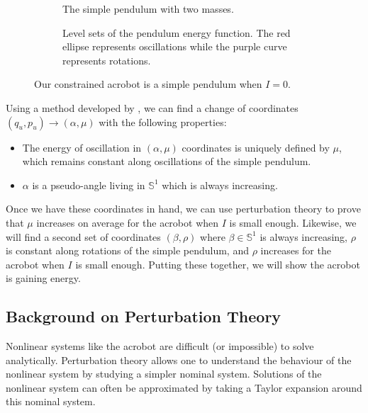 \begin{figure}
    \centering
    \begin{subfigure}[t]{0.45\textwidth}
        \caption{The simple pendulum with two masses.}
        \label{fig:acrobot-I0}
    \end{subfigure}
    \hfill
    \begin{subfigure}[t]{0.45\textwidth}
        \caption{Level sets of the pendulum energy function.
            The red ellipse represents oscillations while the purple curve
            represents rotations.}
        \label{fig:pendulum-level-sets}
    \end{subfigure}
    \caption{Our constrained acrobot is a simple pendulum when \(I = 0\).}
\end{figure}

Using a method developed by \citet{dynamic_vhcs_stabilize_closed_orbits},
we can find a change of coordinates \((q_u,p_u) \to (\alpha, \mu)\) with the
following properties:
\begin{itemize}
    \item The energy of oscillation in \((\alpha,\mu)\) coordinates is 
        uniquely defined by \(\mu\), which remains constant along oscillations
        of the simple pendulum.
    \item \(\alpha\) is a pseudo-angle living in \(\mathbb{S}^1\) which is
        always increasing.
\end{itemize}
Once we have these coordinates in hand, we can use perturbation theory to prove
that \(\mu\) increases on average for the acrobot when \(I\) is small enough.
Likewise, we will find a second set of coordinates \((\beta, \rho)\) where
\(\beta \in \mathbb{S}^1\) is always increasing, \(\rho\) is constant along
rotations of the simple pendulum, and \(\rho\) increases for the acrobot when
\(I\) is small enough.
Putting these together, we will show the acrobot is gaining energy.

\subsection*{Background on Perturbation Theory}
Nonlinear systems like the acrobot are difficult (or impossible) to solve
analytically.
Perturbation theory allows one to understand the behaviour of the nonlinear system
by studying a simpler nominal system. 
Solutions of the nonlinear system can often be approximated by taking a Taylor
expansion around this nominal system.

